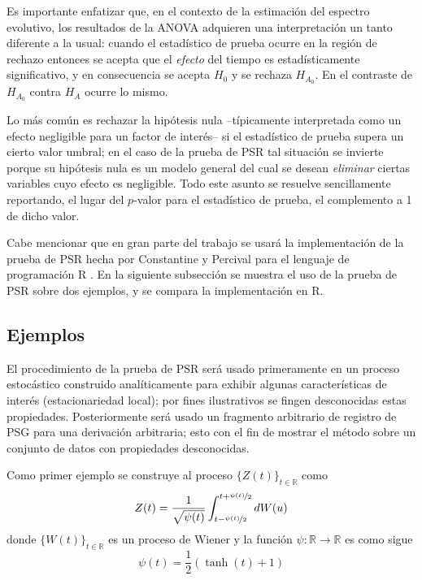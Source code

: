 \documentclass[12pt,letterpaper]{book}
\newcommand{\R}{\mathbb{R}}
\begin{document}
Es importante enfatizar que, en el contexto de la estimación del espectro evolutivo, los resultados de la ANOVA adquieren una interpretación un tanto diferente a la usual: cuando el estadístico de prueba ocurre en la región de rechazo entonces se acepta que el \textit{efecto} del tiempo es estadísticamente significativo, y en consecuencia se acepta $H_0$ y se rechaza $H_{A_0}$. 
%
En el contraste de $H_{A_0}$ contra $H_A$ ocurre lo mismo.

Lo más común es rechazar la hipótesis nula --típicamente interpretada como un efecto negligible para un factor de interés-- si el estadístico de prueba supera un cierto valor umbral; en el caso de la prueba de PSR tal situación se invierte porque su hipótesis nula es un modelo general del cual se desean \textit{eliminar} ciertas variables cuyo efecto es negligible.
%
Todo este asunto se resuelve sencillamente reportando, el lugar del $p$-valor para el estadístico de prueba, el complemento a 1 de dicho valor.

Cabe mencionar que en gran parte del trabajo se usará la implementación de la prueba de PSR hecha por Constantine y Percival para el lenguaje de programación R \cite{R_fractal}.
%
En la siguiente subsección se muestra el uso de la prueba de PSR sobre dos ejemplos, y se compara la implementación en R.


\subsection{Ejemplos}

El procedimiento de la prueba de PSR será usado primeramente en un proceso estocástico construido analíticamente para exhibir algunas características de interés (estacionariedad local); por fines ilustrativos se fingen desconocidas estas propiedades.
%
Posteriormente será usado un fragmento arbitrario de registro de PSG para una derivación arbitraria; esto con el fin de mostrar el método sobre un conjunto de datos con propiedades desconocidas.

Como primer ejemplo se construye al proceso $\{Z(t)\}_{t\in\R}$ como
\begin{equation}
Z(t) = \frac{1}{\sqrt{\psi(t)}} \int_{t-\nicefrac{\psi(t)}{2}}^{t+\nicefrac{\psi(t)}{2}} dW(u) 
\label{lazy20}
\end{equation}
donde $\{W(t)\}_{t\in\R}$ es un proceso de Wiener y la función $\psi:\R\rightarrow\R$ es como sigue
\begin{equation}
\psi(t) = \frac{1}{2} \left( \tanh(t) + 1 \right)
\end{equation}
\end{document}
